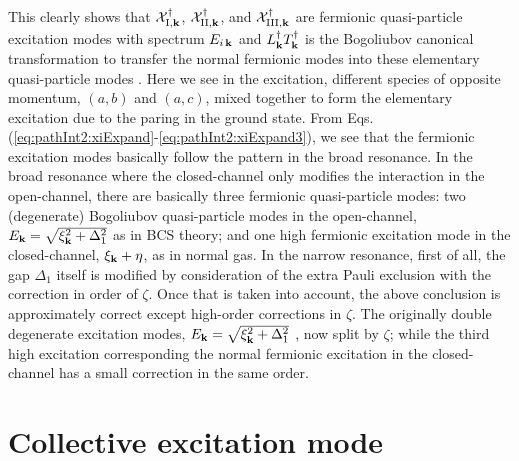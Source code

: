 This clearly shows that $\mathcal{X}^{\dagger}_{\text{I},\mathbf{k}}$, $\mathcal{X}^{\dagger}_{\text{II},\mathbf{k}}$, and $\mathcal{X}^{\dagger}_{\text{III},\mathbf{k}}$ are fermionic quasi-particle excitation modes with spectrum $E_{i\,\mathbf{k}}$ and   $L^{\dagger}_{\mathbf{k}}T^{\dagger}_{\mathbf{k}}$ is  the Bogoliubov canonical transformation to transfer the normal fermionic modes into these elementary quasi-particle modes .  Here we see in the excitation, different species of opposite momentum, $(a,b)$ and $(a,c)$, mixed together to form the elementary excitation due to the paring in the ground state.  
  From Eqs. (\ref{eq:pathInt2:xiExpand}-\ref{eq:pathInt2:xiExpand3}), we see that the fermionic excitation modes basically follow the pattern in the broad resonance.  In the broad resonance where the closed-channel only modifies the interaction in the open-channel,  there are basically three fermionic quasi-particle modes: two (degenerate) Bogoliubov quasi-particle modes  in the open-channel, $E_{\mathbf{k}}=\sqrt{\xi^{2}_{\mathbf{k}}+\Delta_{1}^{2}}$ as in BCS theory; and one high fermionic excitation mode in the closed-channel, $\xi_{\mathbf{k}}+\eta$, as in normal gas.  In the narrow resonance, first of all, the gap $\Delta_{1}$ itself is modified  by consideration of the extra Pauli exclusion with the correction in order of $\zeta$.  Once that is taken into account, the above conclusion is approximately correct except high-order corrections in $\zeta$.   The originally double degenerate excitation modes, $E_{\mathbf{k}}=\sqrt{\xi^{2}_{\mathbf{k}}+\Delta_{1}^{2}}$ , now split by $\zeta$; while the third high excitation corresponding the normal fermionic excitation in the closed-channel has a small correction in the same order. 

\section{Collective excitation mode}
%

